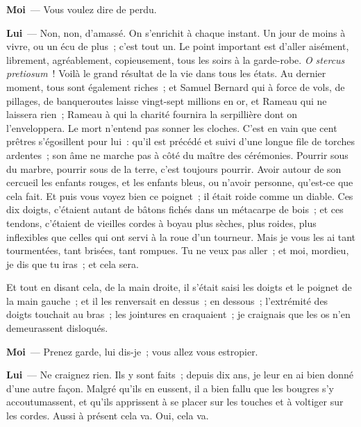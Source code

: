 \documentclass[french,twoside]{book} %
\newcommand{\labelchar}[1]{\textbf{\color{rubric} #1}}
\begin{document}
\labelchar{Moi} — Vous voulez dire de perdu.\par
\labelchar{Lui} — Non, non, d’amassé. On s’enrichit à chaque instant. Un jour de moins à vivre, ou un écu de plus ; c’est tout un. Le point important est d’aller aisément, librement, agréablement, copieusement, tous les soirs à la garde-robe.\emph{ O stercus pretiosum} ! Voilà le grand résultat de la vie dans tous les états. Au dernier moment, tous sont également riches ; et Samuel Bernard qui à force de vols, de pillages, de banqueroutes laisse vingt-sept millions en or, et Rameau qui ne laissera rien ; Rameau à qui la charité fournira la serpillière dont on l’enveloppera. Le mort n’entend pas sonner les cloches. C’est en vain que cent prêtres s’égosillent pour lui : qu’il est précédé et suivi d’une longue file de torches ardentes ; son âme ne marche pas à côté du maître des cérémonies. Pourrir sous du marbre, pourrir sous de la terre, c’est toujours pourrir. Avoir autour de son cercueil les enfants rouges, et les enfants bleus, ou n’avoir personne, qu’est-ce que cela fait. Et puis vous voyez bien ce poignet ; il était roide comme un diable. Ces dix doigts, c’étaient autant de bâtons fichés dans un métacarpe de bois ; et ces tendons, c’étaient de vieilles cordes à boyau plus sèches, plus roides, plus inflexibles que celles qui ont servi à la roue d’un tourneur. Mais je vous les ai tant tourmentées, tant brisées, tant rompues. Tu ne veux pas aller ; et moi, mordieu, je dis que tu iras ; et cela sera.\par
Et tout en disant cela, de la main droite, il s’était saisi les doigts et le poignet de la main gauche ; et il les renversait en dessus ; en dessous ; l’extrémité des doigts touchait au bras ; les jointures en craquaient ; je craignais que les os n’en demeurassent disloqués.\par
\labelchar{Moi} — Prenez garde, lui dis-je ; vous allez vous estropier.\par
\labelchar{Lui} — Ne craignez rien. Ils y sont faits ; depuis dix ans, je leur en ai bien donné d’une autre façon. Malgré qu’ils en eussent, il a bien fallu que les bougres s’y accoutumassent, et qu’ils apprissent à se placer sur les touches et à voltiger sur les cordes. Aussi à présent cela va. Oui, cela va.\par
\end{document}
